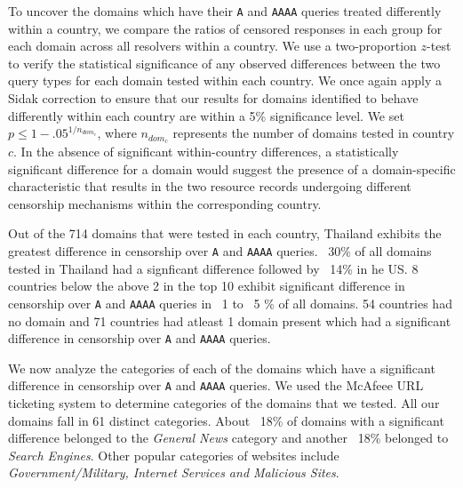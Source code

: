 To uncover the domains which have their {\tt A} and {\tt AAAA} queries treated
differently within a country, we compare the ratios of censored responses in
each group for each domain across all resolvers within a country.  
%
We use a two-proportion $z$-test to verify the statistical significance of any
observed differences between the two query types for each domain tested within
each country. We once again apply a Sidak correction to ensure that our results
for domains identified to behave differently within each country are within
a 5\% significance level. We set $p \leq 1-{.05}^{1/n_{dom_{c}}}$, where
$n_{dom_{c}}$ represents the number of domains tested in country $c$.
%
In the absence of significant within-country differences, a statistically
significant difference for a domain would suggest the presence of
a domain-specific characteristic that results in the two resource records
undergoing different censorship mechanisms within the corresponding country.

Out of the 714 domains that were tested in each country, Thailand exhibits the greatest
difference in censorship over {\tt A} and {\tt AAAA} queries. ~30\% of all domains
tested in Thailand had a signficant difference followed by ~14\% in he US. 8 countries
below the above 2 in the top 10 exhibit significant difference in censorship over 
{\tt A} and {\tt AAAA} queries in ~1 to ~5 \% of all domains. 54 countries had no
domain and 71 countries had atleast 1 domain present which had a significant difference 
in censorship over {\tt A} and {\tt AAAA} queries.

We now analyze the categories of each of the domains which have a significant difference
in censorship over  {\tt A} and {\tt AAAA} queries. We used the McAfeee URL ticketing system
\cite{mcafee} to determine categories of the domains that we tested. All our domains fall in
61 distinct categories. About ~18\% of domains with a significant difference belonged to the 
\textit{General News} category and another ~18\% belonged to \textit{Search Engines}. Other 
popular categories of websites include \textit{Government/Military, Internet Services 
and Malicious Sites}.

